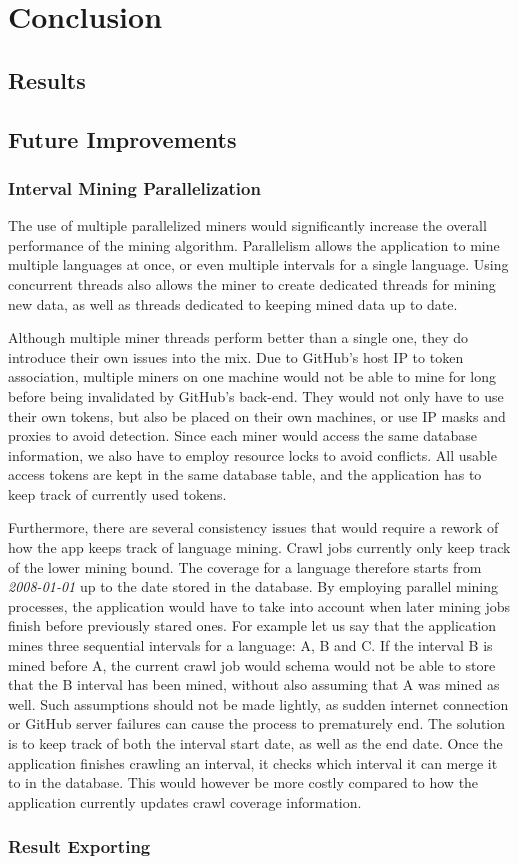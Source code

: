 \chapter{Conclusion}\label{ch:6}

\section{Results}

\section{Future Improvements}

\subsection{Interval Mining Parallelization}

The use of multiple parallelized miners would significantly increase the overall performance of the mining algorithm.
Parallelism allows the application to mine multiple languages at once, or even multiple intervals for a single language.
Using concurrent threads also allows the miner to create dedicated threads for mining new data, as well as threads dedicated to keeping mined data up to date.

Although multiple miner threads perform better than a single one, they do introduce their own issues into the mix.
Due to GitHub's host IP to token association, multiple miners on one machine would not be able to mine for long before being invalidated by GitHub's back-end.
They would not only have to use their own tokens, but also be placed on their own machines, or use IP masks and proxies to avoid detection.
Since each miner would access the same database information, we also have to employ resource locks to avoid conflicts.
All usable access tokens are kept in the same database table, and the application has to keep track of currently used tokens.

Furthermore, there are several consistency issues that would require a rework of how the app keeps track of language mining.
Crawl jobs currently only keep track of the lower mining bound.
The coverage for a language therefore starts from \textit{2008-01-01} up to the date stored in the database.
By employing parallel mining processes, the application would have to take into account when later mining jobs finish before previously stared ones.
For example let us say that the application mines three sequential intervals for a language: A, B and C\@.
If the interval B is mined before A, the current crawl job would schema would not be able to store that the B interval has been mined, without also assuming that A was mined as well.
Such assumptions should not be made lightly, as sudden internet connection or GitHub server failures can cause the process to prematurely end.
The solution is to keep track of both the interval start date, as well as the end date.
Once the application finishes crawling an interval, it checks which interval it can merge it to in the database.
This would however be more costly compared to how the application currently updates crawl coverage information.

\subsection{Result Exporting}

